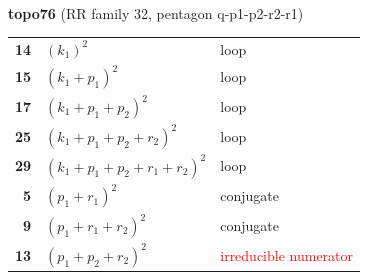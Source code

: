 \documentclass[10pt]{article}
\begin{document}
\begin{minipage}[t]{0.48\textwidth}
{}\\[2mm]\textbf{topo76} (RR family 32, pentagon q-p1-p2-r2-r1)\\[2pt]{\footnotesize\begin{tabular}{@{}r@{\ \ }l@{\ \ }l@{}}\textbf{14} & $(k_1)^2$ & loop\\
\textbf{15} & $(k_1+p_1)^2$ & loop\\
\textbf{17} & $(k_1+p_1+p_2)^2$ & loop\\
\textbf{25} & $(k_1+p_1+p_2+r_2)^2$ & loop\\
\textbf{29} & $(k_1+p_1+p_2+r_1+r_2)^2$ & loop\\
\textbf{5} & $(p_1+r_1)^2$ & conjugate\\
\textbf{9} & $(p_1+r_1+r_2)^2$ & conjugate\\
\textbf{13} & $(p_1+p_2+r_2)^2$ & \textcolor{red}{irreducible numerator}\\\end{tabular}}\end{minipage}

\bigskip
\end{document}
